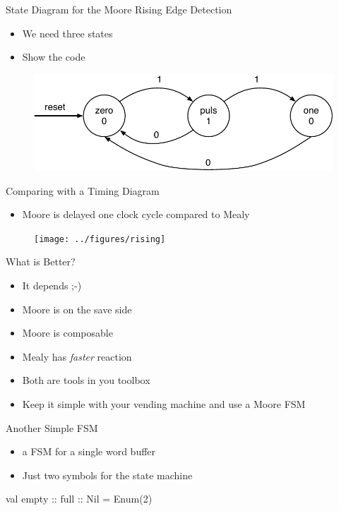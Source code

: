 \begin{frame}[fragile]{State Diagram for the Moore Rising Edge Detection}
\begin{itemize}
\item We need three states
\item Show the code
\end{itemize}
\begin{figure}
  \includegraphics[scale=\scale]{../figures/state-diag-rising-moore}
\end{figure}
\end{frame}

\begin{frame}[fragile]{Comparing with a Timing Diagram}
\begin{itemize}
\item Moore is delayed one clock cycle compared to Mealy
\end{itemize}
\begin{figure}
  \texttt{[image: ../figures/rising]}
\end{figure}
\end{frame}

\begin{frame}[fragile]{What is Better?}
\begin{itemize}
\item It depends ;-)
\item Moore is on the save side
\item Moore is composable
\item Mealy has \emph{faster} reaction
\item Both are tools in you toolbox
\item Keep it simple with your vending machine and use a Moore FSM
\end{itemize}
\end{frame}

\begin{frame}[fragile]{Another Simple FSM}
\begin{itemize}
\item a FSM for a single word buffer
\item Just two symbols for the state machine
\end{itemize}
\begin{chisel}
  val empty :: full :: Nil = Enum(2)
\end{chisel}
\end{frame}

